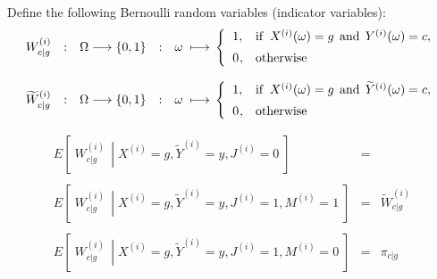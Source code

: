 \vskip 0.3cm
\noindent
Define the following Bernoulli random variables (indicator variables):
\begin{equation*}
\begin{array}{ccccl}
	W^{(i)}_{c \vert g} &:& \Omega \longrightarrow \{0,1\} &:& \omega\;\longmapsto\,
	\left\{
		\begin{array}{cl}
		1, & \textnormal{if}\;\; X^{(i)}(\omega) = g \,\;\textnormal{and}\;\, Y^{(i)}(\omega) = c,
		\\
		\overset{{\color{white}-}}{0}, & \textnormal{otherwise}
		\end{array}
	\right.
\\ \\
	\widetilde{W}^{(i)}_{c \vert g} &:& \Omega \longrightarrow \{0,1\} &:& \omega\;\longmapsto\,
	\left\{
		\begin{array}{cl}
		1, & \textnormal{if}\;\; X^{(i)}(\omega) = g \,\;\textnormal{and}\;\, \widetilde{Y}^{(i)}(\omega) = c,
		\\
		\overset{{\color{white}-}}{0}, & \textnormal{otherwise}
		\end{array}
	\right.
\end{array}
\end{equation*}

\vskip 0.3cm
\noindent
\begin{equation*}
\begin{array}{lcl}
E\!\left[\;\left.W^{(i)}_{c \vert g}\,\;\right\vert\;X^{(i)}=g,\widetilde{Y}^{(i)}=y,J^{(i)}=0\;\right]
&=& 
\\ \\
E\!\left[\;\left.W^{(i)}_{c \vert g}\,\;\right\vert\;X^{(i)}=g,\widetilde{Y}^{(i)}=y,J^{(i)}=1,M^{(i)}=1\;\right]
&=& \widetilde{W}^{(i)}_{c \vert g}
\\ \\
E\!\left[\;\left.W^{(i)}_{c \vert g}\,\;\right\vert\;X^{(i)}=g,\widetilde{Y}^{(i)}=y,J^{(i)}=1,M^{(i)}=0\;\right]
&=& \pi_{c \vert g}
\end{array}
\end{equation*}

